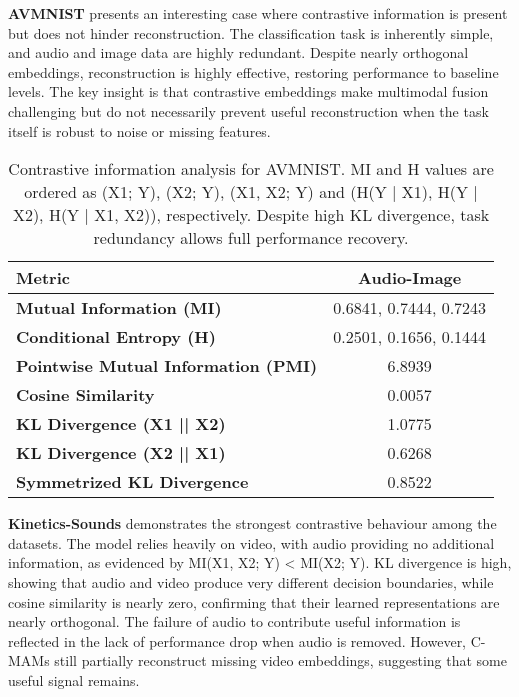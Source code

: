 \textbf{AVMNIST} presents an interesting case where contrastive information is present but does not hinder reconstruction. The classification task is inherently simple, and audio and image data are highly redundant. Despite nearly orthogonal embeddings, reconstruction is highly effective, restoring performance to baseline levels. The key insight is that contrastive embeddings make multimodal fusion challenging but do not necessarily prevent useful reconstruction when the task itself is robust to noise or missing features.

\begin{table}[h!]
    \centering
    \caption{Contrastive information analysis for AVMNIST. MI and H values are ordered as (X1; Y), (X2; Y), (X1, X2; Y) and (H(Y | X1), H(Y | X2), H(Y | X1, X2)), respectively. Despite high KL divergence, task redundancy allows full performance recovery.}
    \label{tab:avmnist_contrastive}
    \begin{tabular}{l|c}
    \hline
    \textbf{Metric} & \textbf{Audio-Image} \\ \hline
    \textbf{Mutual Information (MI)} & 0.6841, 0.7444, 0.7243 \\
    \textbf{Conditional Entropy (H)} & 0.2501, 0.1656, 0.1444 \\
    \textbf{Pointwise Mutual Information (PMI)} & 6.8939 \\
    \textbf{Cosine Similarity} & 0.0057 \\
    \textbf{KL Divergence (X1 || X2)} & 1.0775 \\
    \textbf{KL Divergence (X2 || X1)} & 0.6268 \\
    \textbf{Symmetrized KL Divergence} & 0.8522 \\ \hline
    \end{tabular}%
\end{table}

\textbf{Kinetics-Sounds} demonstrates the strongest contrastive behaviour among the datasets. The model relies heavily on video, with audio providing no additional information, as evidenced by MI(X1, X2; Y) < MI(X2; Y). KL divergence is high, showing that audio and video produce very different decision boundaries, while cosine similarity is nearly zero, confirming that their learned representations are nearly orthogonal. The failure of audio to contribute useful information is reflected in the lack of performance drop when audio is removed. However, C-MAMs still partially reconstruct missing video embeddings, suggesting that some useful signal remains.

